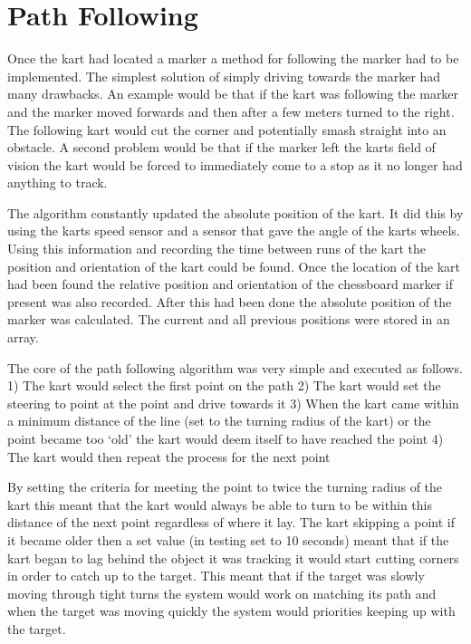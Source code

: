 \section{Path Following}
Once the kart had located a marker a method for following the marker had to be implemented. The simplest solution of simply driving towards the marker had many drawbacks. An example would be that if the kart was following the marker and the marker moved forwards and then after a few meters turned to the right. The following kart would cut the corner and potentially smash straight into an obstacle. A second problem would be that if the marker left the karts field of vision the kart would be forced to immediately come to a stop as it no longer had anything to track.

The algorithm constantly updated the absolute position of the kart. It did this by using the karts speed sensor and a sensor that gave the angle of the karts wheels. Using this information and recording the time between runs of the kart the position and orientation of the kart could be found. Once the location of the kart had been found the relative position and orientation of the chessboard marker if present was also recorded. After this had been done the absolute position of the marker was calculated. The current and all previous positions were stored in an array.

The core of the path following algorithm was very simple and executed as follows. 
1) The kart would select the first point on the path
2) The kart would set the steering to point at the point and drive towards it
3) When the kart came within a minimum distance of the line (set to the turning radius of the kart)  or the point became too ‘old’ the kart would deem itself to have reached the point
4) The kart would then repeat the process for the next point

By setting the criteria for meeting the point to twice the turning radius of the kart this meant that the kart would always be able to turn to be within this distance  of the next point regardless of where it lay. The kart skipping a point if it became older then a set value (in testing set to 10 seconds) meant that if the kart began to lag behind the object it was tracking it would start cutting corners in order to catch up to the target. This meant that if the target was slowly moving through tight turns the system would work on matching its path and when the target was moving quickly the system would priorities keeping up with the target.